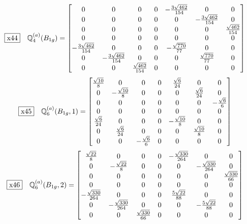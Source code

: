 \documentclass[fleqn,10pt,landscape]{jsarticle}
\begin{document}
\begin{dmath*}
\fbox{x44}\quad \mathbb{Q}_{4}^{(a)}(B_{1g})=\begin{bmatrix} 0 & 0 & 0 & 0 & - \frac{3 \sqrt{462}}{154} & 0 & 0 \\ 0 & 0 & 0 & 0 & 0 & - \frac{3 \sqrt{462}}{154} & 0 \\ 0 & 0 & 0 & 0 & 0 & 0 & \frac{\sqrt{462}}{154} \\ 0 & 0 & 0 & 0 & 0 & 0 & 0 \\ - \frac{3 \sqrt{462}}{154} & 0 & 0 & 0 & - \frac{\sqrt{770}}{77} & 0 & 0 \\ 0 & - \frac{3 \sqrt{462}}{154} & 0 & 0 & 0 & \frac{\sqrt{770}}{77} & 0 \\ 0 & 0 & \frac{\sqrt{462}}{154} & 0 & 0 & 0 & 0 \end{bmatrix}
\end{dmath*}
\begin{dmath*}
\fbox{x45}\quad \mathbb{Q}_{6}^{(a)}(B_{1g},1)=\begin{bmatrix} \frac{\sqrt{10}}{8} & 0 & 0 & 0 & \frac{\sqrt{6}}{24} & 0 & 0 \\ 0 & - \frac{\sqrt{10}}{8} & 0 & 0 & 0 & \frac{\sqrt{6}}{24} & 0 \\ 0 & 0 & 0 & 0 & 0 & 0 & - \frac{\sqrt{6}}{6} \\ 0 & 0 & 0 & 0 & 0 & 0 & 0 \\ \frac{\sqrt{6}}{24} & 0 & 0 & 0 & - \frac{\sqrt{10}}{8} & 0 & 0 \\ 0 & \frac{\sqrt{6}}{24} & 0 & 0 & 0 & \frac{\sqrt{10}}{8} & 0 \\ 0 & 0 & - \frac{\sqrt{6}}{6} & 0 & 0 & 0 & 0 \end{bmatrix}
\end{dmath*}
\begin{dmath*}
\fbox{x46}\quad \mathbb{Q}_{6}^{(a)}(B_{1g},2)=\begin{bmatrix} \frac{\sqrt{22}}{8} & 0 & 0 & 0 & - \frac{\sqrt{330}}{264} & 0 & 0 \\ 0 & - \frac{\sqrt{22}}{8} & 0 & 0 & 0 & - \frac{\sqrt{330}}{264} & 0 \\ 0 & 0 & 0 & 0 & 0 & 0 & \frac{\sqrt{330}}{66} \\ 0 & 0 & 0 & 0 & 0 & 0 & 0 \\ - \frac{\sqrt{330}}{264} & 0 & 0 & 0 & \frac{5 \sqrt{22}}{88} & 0 & 0 \\ 0 & - \frac{\sqrt{330}}{264} & 0 & 0 & 0 & - \frac{5 \sqrt{22}}{88} & 0 \\ 0 & 0 & \frac{\sqrt{330}}{66} & 0 & 0 & 0 & 0 \end{bmatrix}
\end{dmath*}
\end{document}
